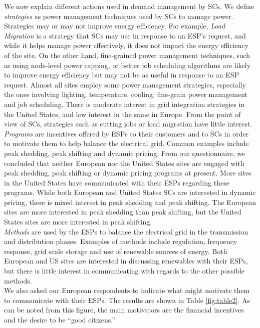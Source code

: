 We now explain different actions used in demand management by SCs. We define \emph{strategies} as power management techniques used by SCs to manage power. Strategies may or may not improve energy efficiency. For example, \emph{Load Migration} is a strategy that SCs may use in response to an ESP's request, and while it helps manage power effectively, it does not impact the energy efficiency of the site. On the other hand, fine-grained power management techniques, such as using node-level power capping, or better job scheduling algorithms are likely to improve energy efficiency but may not be as useful in response to an ESP request. Almost all sites employ some power management strategies, especially the ones involving lighting, temperature, cooling, fine-grain power management and job scheduling. There is moderate interest in grid integration strategies in the United States, and low interest in the same in Europe. From the point of view of SCs, strategies such as cutting jobs or load migration have little interest. \\

\emph{Programs} are incentives offered by ESPs to their customers and to SCs in order to motivate them to help balance the electrical grid. Common examples include peak shedding, peak shifting and dynamic pricing. From our questionnaire, we concluded that neither European nor the United States sites are engaged with peak shedding, peak shifting or dynamic pricing programs at present. More sites in the United States have communicated with their ESPs regarding these programs. While both European and United States SCs are interested in dynamic pricing, there is mixed interest in peak shedding and peak shifting. The European sites are more interested in peak shedding than peak shifting, but the United States sites are more interested in peak shifting. \\

\emph{Methods} are used by the ESPs to balance the electrical grid in the transmission and distribution phases. Examples of methods include regulation, frequency response, grid scale storage and use of renewable sources of energy. Both European and US sites are interested in discussing renewables with their ESPs, but there is little interest in communicating with regards to the other possible methods. \\

We also asked our European respondents to indicate what might motivate them to communicate with their ESPs. The results are shown in Table \ref{fig:table2}. As can be noted from this figure, the main motivators are the financial incentives and the desire to be ``good citizens.''


%
